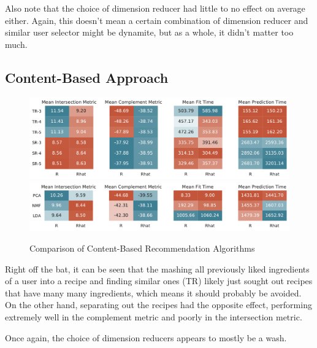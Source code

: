 \documentclass[11pt]{article}
\begin{document}
Also note that the choice of dimension reducer had little to no effect on average either. Again, this doesn't mean a certain combination of dimension reducer and similar user selector might be dynamite, but as a whole, it didn't matter too much.

\subsection{Content-Based Approach}

\begin{figure}[b!]
\centering
\includegraphics[width=1\textwidth]{figs/recipe_rdr.pdf}
\includegraphics[width=1\textwidth]{figs/recipe_dr.pdf}
\caption{Comparison of Content-Based Recommendation Algorithms}
\label{fig:recipe_results}
\end{figure}

Right off the bat, it can be seen that the mashing all previously liked ingredients of a user into a recipe and finding similar ones (TR) likely just sought out recipes that have many many ingredients, which means it should probably be avoided. On the other hand, separating out the recipes had the opposite effect, performing extremely well in the complement metric and poorly in the intersection metric.

Once again, the choice of dimension reducers appears to mostly be a wash.
\end{document}
